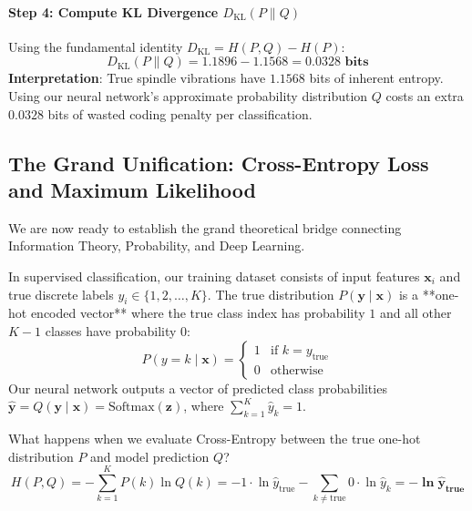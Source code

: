 \begin{example}
\paragraph{Step 4: Compute KL Divergence $D_{\text{KL}}(P \parallel Q)$}
Using the fundamental identity $D_{\text{KL}} = H(P, Q) - H(P)$:
\begin{equation*}
D_{\text{KL}}(P \parallel Q) = 1.1896 - 1.1568 = \mathbf{0.0328\text{ bits}}
\end{equation*}
\textbf{Interpretation}: True spindle vibrations have $1.1568$ bits of inherent entropy. Using our neural network's approximate probability distribution $Q$ costs an extra $0.0328$ bits of wasted coding penalty per classification.
\end{example}

\subsection{The Grand Unification: Cross-Entropy Loss and Maximum Likelihood}\label{subsec:opt_cross_entropy_mle}

We are now ready to establish the grand theoretical bridge connecting Information Theory, Probability, and Deep Learning.

In supervised classification, our training dataset consists of input features $\mathbf{x}_i$ and true discrete labels $y_i \in \{1, 2, \dots, K\}$.
The true distribution $P(\mathbf{y} \mid \mathbf{x})$ is a **one-hot encoded vector** where the true class index has probability $1$ and all other $K - 1$ classes have probability $0$:
\begin{equation}
P(y = k \mid \mathbf{x}) = \begin{cases} 1 & \text{if } k = y_{\text{true}} \\ 0 & \text{otherwise} \end{cases}
\end{equation}
Our neural network outputs a vector of predicted class probabilities $\hat{\mathbf{y}} = Q(\mathbf{y} \mid \mathbf{x}) = \text{Softmax}(\mathbf{z})$, where $\sum_{k=1}^K \hat{y}_k = 1$.

What happens when we evaluate Cross-Entropy between the true one-hot distribution $P$ and model prediction $Q$?
\begin{equation}
H(P, Q) = -\sum_{k=1}^{K} P(k) \ln Q(k) = -1 \cdot \ln \hat{y}_{\text{true}} - \sum_{k \ne \text{true}} 0 \cdot \ln \hat{y}_k = \mathbf{-\ln \hat{y}_{\text{true}}}\label{eq:categorical_ce_loss}
\end{equation}

